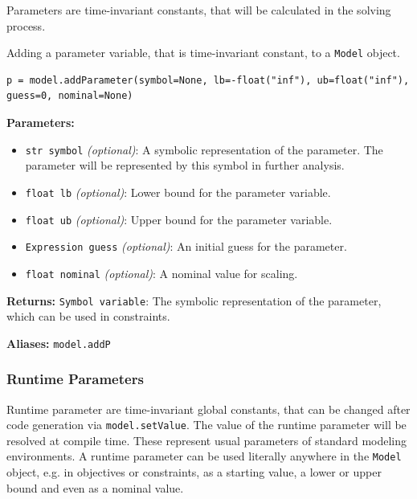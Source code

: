 \documentclass[12pt]{article}
\begin{document}
	Parameters are time-invariant constants, that will be calculated in the solving process.
		
	\begin{mdframed}[backgroundcolor=gray!10, roundcorner=10pt, linewidth=1pt]
		
		Adding a parameter variable, that is time-invariant constant, to a \texttt{Model} object.
		
		\begin{lstlisting}
p = model.addParameter(symbol=None, lb=-float("inf"), ub=float("inf"), guess=0, nominal=None)
		\end{lstlisting}
		\label{addParameter}
		\textbf{Parameters:}
		\begin{itemize}
			\item \texttt{str symbol} \emph{(optional)}: A symbolic representation of the parameter. The parameter will be represented by this symbol in further analysis.
			\item \texttt{float lb} \emph{(optional)}: Lower bound for the parameter variable.
			\item \texttt{float ub} \emph{(optional)}: Upper bound for the parameter variable.
			\item \texttt{Expression guess} \emph{(optional)}: An initial guess for the parameter.
			\item \texttt{float nominal} \emph{(optional)}: A nominal value for scaling.
		\end{itemize}
		
		\textbf{Returns:} 
		\texttt{Symbol variable}: The symbolic representation of the parameter, which can be used in constraints.
		
		\textbf{Aliases:} \texttt{model.addP}
	\end{mdframed}
	
	\subsubsection{Runtime Parameters}
	\label{c:runtimeParameters}
	Runtime parameter are time-invariant global constants, that can be changed after code generation via \texttt{model.setValue}. The value of the runtime parameter will be resolved at compile time. These represent usual parameters of standard modeling environments. A runtime parameter can be used literally anywhere in the \texttt{Model} object, e.g. in objectives or constraints, as a starting value, a lower or upper bound and even as a nominal value.
	
\end{document}
